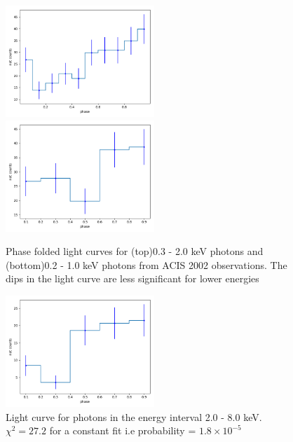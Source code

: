\documentclass[a4paper,fleqn,usenatbib]{mnras}
\begin{document}
\begin{figure}
 \centering
 \includegraphics[width=0.5\textwidth]{Figures/2002_1low.png}  \includegraphics[width = 0.5\textwidth]{Figures/2002_1vlow.png}
 \caption{Phase folded light curves for (top)0.3 - 2.0 keV photons and (bottom)0.2 - 1.0 keV photons from ACIS 2002 observations.
 The dips in the light curve are less significant for lower energies}
 \label{fig:2002_low}
\end{figure}

\begin{figure}
 \centering
 \includegraphics[width=0.5\textwidth]{Figures/2002_1high.png}
 \caption{Light curve for photons in the energy interval 2.0 - 8.0 keV. $\chi^2 = 27.2$ for a constant fit i.e probability  = $1.8 \times 10^{-5}$}
 \label{fig:2002_high}
\end{figure}
\end{document}
